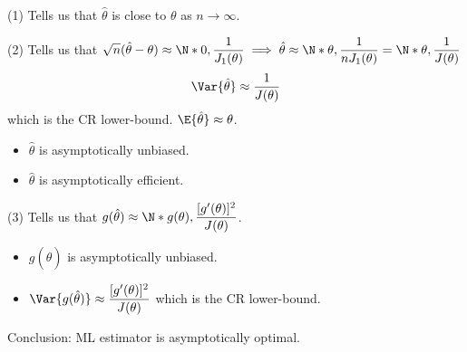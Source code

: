 \begin{Remark}{}{}
    (1) Tells us that $ \hat{\theta} $ is close to $ \theta $
    as $ n\to\infty $.

    (2) Tells us that $ \displaystyle \sqrt{n}(\hat{\theta}-\theta)\approx
        \N*{0,\frac{1}{J_1(\theta)}}\implies
        \hat{\theta}\approx \N*{\theta,\frac{1}{nJ_1(\theta)}}=\N*{
            \theta,\frac{1}{J(\theta)}
        } $
    \[ \Var{\hat{\theta}}\approx \frac{1}{J(\theta)}  \]
    which is the CR lower-bound. $ \E{\hat{\theta}}\approx \theta $.
    \begin{itemize}
        \item $ \hat{\theta} $ is asymptotically unbiased.
        \item $ \hat{\theta} $ is asymptotically efficient.
    \end{itemize}

    (3) Tells us that $ \displaystyle  g(\hat{\theta})\approx \N*{g(\theta),
            \frac{[g^\prime(\theta)]^2}{J(\theta)}} $.
    \begin{itemize}
        \item $ g(\hat{\theta}) $ is asymptotically unbiased.
        \item $ \displaystyle \Var{g(\hat{\theta})}\approx
                  \frac{[g^\prime(\theta)]^2}{J(\theta)} $
              which is the CR lower-bound.
    \end{itemize}
\end{Remark}
Conclusion: ML estimator is asymptotically optimal.
